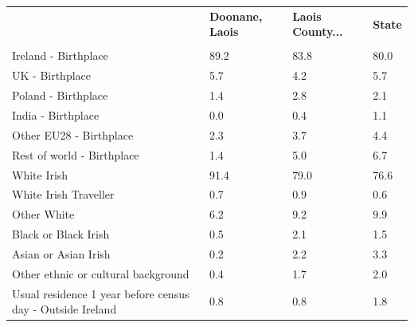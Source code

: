 \documentclass{article}
\begin{document}
\pagebreak
\begin{table}[h]	
\centering
		\begin{tabular}{KTTT}
  \hline
& \textbf{Doonane, Laois} & \textbf{Laois County...} & \textbf{State}\\ 
  \hline
    \\ 
    \hline
Ireland - Birthplace & 89.2& 83.8& 80.0\\
UK - Birthplace & 5.7& 4.2& 5.7\\
Poland - Birthplace & 1.4& 2.8& 2.1\\
India - Birthplace & 0.0& 0.4& 1.1\\
Other EU28 - Birthplace & 2.3& 3.7& 4.4\\
Rest of world - Birthplace & 1.4& 5.0& 6.7\\
    \hline
White Irish & 91.4& 79.0& 76.6\\
White Irish Traveller & 0.7& 0.9& 0.6\\
Other White & 6.2& 9.2& 9.9\\
Black or Black Irish & 0.5& 2.1& 1.5\\
Asian or Asian Irish & 0.2& 2.2& 3.3\\
Other ethnic or cultural background & 0.4& 1.7& 2.0\\
    \hline
Usual residence 1 year before census day - Outside Ireland & 0.8& 0.8& 1.8\\


\end{tabular}
\end{table}
\end{document}
